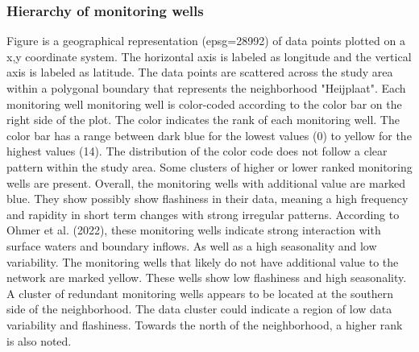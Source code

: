 \subsubsection{Hierarchy of monitoring wells}
Figure  is a geographical representation (epsg=28992) of data points plotted on a x,y coordinate system. The horizontal axis is labeled as longitude and the vertical axis is labeled as latitude. The data points are scattered across the study area within a polygonal boundary that represents the neighborhood "Heijplaat". Each monitoring well monitoring well is color-coded according to the color bar on the right side of the plot. The color indicates the rank of each monitoring well. The color bar has a range between dark blue for the lowest values (0) to yellow for the highest values (14). The distribution of the color code does not follow a clear pattern within the study area. Some clusters of higher or lower ranked monitoring wells are present. Overall, the monitoring wells with additional value are marked blue. They show possibly show flashiness in their data, meaning a high frequency and rapidity in short term changes with strong irregular patterns. According to Ohmer et al. (2022), these monitoring wells indicate strong interaction with surface waters and boundary inflows. As well as a high seasonality and low variability. The monitoring wells that likely do not have additional value to the network are marked yellow. These wells show low flashiness and high seasonality. A cluster of redundant monitoring wells appears to be located at the southern side of the neighborhood. The data cluster could indicate a region of low data variability and flashiness. Towards the north of the neighborhood, a higher rank is also noted. 


